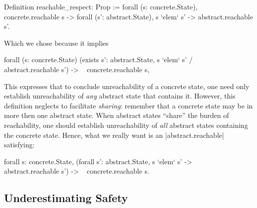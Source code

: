 \documentclass[runningheads]{llncs}
\newcommand{\weg}[1]{}
\begin{document}
\begin{code}
Definition reachable_respect: Prop :=
  forall (s: concrete.State), concrete.reachable s ->
    forall (s': abstract.State), s `elem` s' -> abstract.reachable s'.
\end{code}
Which we chose because it implies
\begin{code}
forall (s: concrete.State)
  (exists s': abstract.State, s `elem` s' /\ ~ abstract.reachable s') ->
    ~ concrete.reachable s,
\end{code}
This expresses that to conclude unreachability of a concrete state,
one need only establish unreachability of \emph{any} abstract state
that contains it. However, this definition neglects to facilitate {\em
  sharing}: remember that a concrete state may be in more then one
abstract state. When abstract states ``share'' the burden of
reachability, one should establish unreachability of \emph{all}
abstract states containing the concrete state. Hence, what we really
want is an |abstract.reachable| satisfying:
\begin{code}
forall s: concrete.State,
  (forall s': abstract.State, s `elem` s' -> ~ abstract.reachable s') ->
  ~ concrete.reachable s.
\end{code}
\weg{
This property follows from the following new definition of |reachable_respect| we will use:
\begin{code}
Definition reachable_respect: Prop :=
  shared_cover concrete.reachable abstract.reachable.
\end{code}
}

\subsection{Underestimating Safety}
\label{underestimatingsafety}
\end{document}
